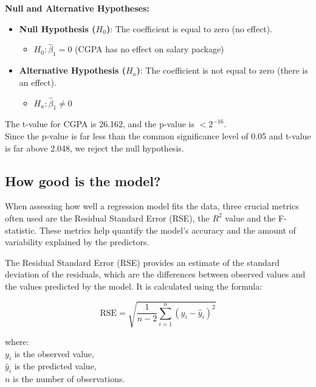 \begin{example}
    \textbf{Null and Alternative Hypotheses:}
\begin{itemize}
    \item \textbf{Null Hypothesis (\(H_0\))}: The coefficient is equal to zero (no effect).
    \begin{itemize}
        \item \(H_0: \hat{\beta}_1 = 0\) (CGPA has no effect on salary package)
    \end{itemize}
    \item \textbf{Alternative Hypothesis (\(H_a\))}: The coefficient is not equal to zero (there is an effect).
    \begin{itemize}
        \item \(H_a: \hat{\beta}_1 \neq 0\)
    \end{itemize}
\end{itemize}

The t-value for CGPA is 26.162, and the p-value is $< 2^{-16}$.\\

Since the p-value is far less than the common significance level of 0.05 and t-value is far above 2.048, we reject the null hypothesis.
\end{example}

\subsection{How good is the model?}

When assessing how well a regression model fits the data, three crucial metrics often used are the Residual Standard Error (RSE), the \(R^2\) value and the F-statistic. These metrics help quantify the model's accuracy and the amount of variability explained by the predictors.

\begin{definition}
    The Residual Standard Error (RSE) provides an estimate of the standard deviation of the residuals, which are the differences between observed values and the values predicted by the model. It is calculated using the formula:

\[
\text{RSE} = \sqrt{\frac{1}{n-2} \sum_{i=1}^{n} (y_i - \hat{y}_i)^2}
\]

where:\\
\(y_i\) is the observed value,\\
\(\hat{y}_i\) is the predicted value,\\
\(n\) is the number of observations.
\end{definition}

